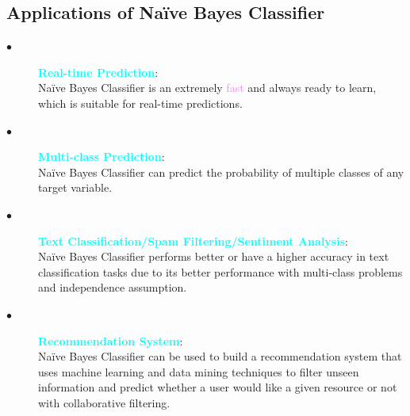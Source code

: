 \documentclass{book}
\begin{document}
\subsection{Applications of Naïve Bayes Classifier}
\begin{description}
    \item[$\bullet$] \textcolor{cyan}{\textbf{Real-time Prediction}}:\\
    Naïve Bayes Classifier is an extremely \textcolor{violet}{fast} and always ready to learn, which is suitable for real-time predictions.
    \item[$\bullet$] \textcolor{cyan}{\textbf{Multi-class Prediction}}:\\
    Naïve Bayes Classifier can predict the probability of multiple classes of any target variable.
    \item[$\bullet$] \textcolor{cyan}{\textbf{Text Classification/Spam Filtering/Sentiment Analysis}}:\\
    Naïve Bayes Classifier performs better or have a higher accuracy in text classification tasks due to its better performance with multi-class problems and independence assumption.
    \item[$\bullet$] \textcolor{cyan}{\textbf{Recommendation System}}:\\
    Naïve Bayes Classifier can be used to build a recommendation system that uses machine learning and data mining techniques to filter unseen information and predict whether a user would like a given resource or not with collaborative filtering.
\end{description}
\end{document}
